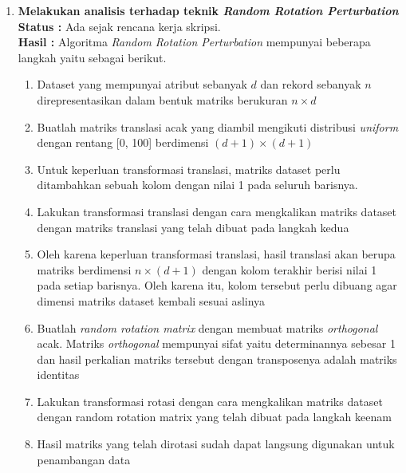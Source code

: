 \documentclass[a4paper,twoside]{article}
\begin{document}
\begin{enumerate}
		\item \textbf{Melakukan analisis terhadap teknik \textit{Random Rotation Perturbation}}\\
		{\bf Status :} Ada sejak rencana kerja skripsi.\\
		{\bf Hasil :} Algoritma \textit{Random Rotation Perturbation} mempunyai beberapa langkah yaitu sebagai berikut.
		\begin{enumerate}
			\item Dataset yang mempunyai atribut sebanyak \(d\) dan rekord sebanyak \(n\) direpresentasikan dalam bentuk matriks berukuran \(n \times d\)
			\item Buatlah matriks translasi acak yang diambil mengikuti distribusi \textit{uniform} dengan rentang [0, 100] berdimensi \((d+1)\times(d+1)\)
			\item Untuk keperluan transformasi translasi, matriks dataset perlu ditambahkan sebuah kolom dengan nilai 1 pada seluruh barisnya.
			\item Lakukan transformasi translasi dengan cara mengkalikan matriks dataset dengan matriks translasi yang telah dibuat pada langkah kedua
			\item Oleh karena keperluan transformasi translasi, hasil translasi akan berupa matriks berdimensi \(n\times(d+1)\) dengan kolom terakhir berisi nilai 1 pada setiap barisnya. Oleh karena itu, kolom tersebut perlu dibuang agar dimensi matriks dataset kembali sesuai aslinya
			\item Buatlah \textit{random rotation matrix} dengan membuat matriks \textit{orthogonal} acak. Matriks \textit{orthogonal} mempunyai sifat yaitu determinannya sebesar 1 dan hasil perkalian matriks tersebut dengan transposenya adalah matriks identitas
			\item Lakukan transformasi rotasi dengan cara mengkalikan matriks dataset dengan random rotation matrix yang telah dibuat pada langkah keenam
			\item Hasil matriks yang telah dirotasi sudah dapat langsung digunakan untuk penambangan data
		\end{enumerate}


\end{enumerate}
\end{document}
